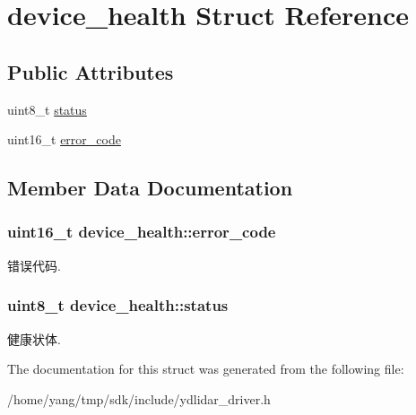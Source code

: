 \hypertarget{structdevice__health}{}\section{device\+\_\+health Struct Reference}
\label{structdevice__health}
\subsection*{Public Attributes}
\begin{DoxyCompactItemize}
\item 
uint8\+\_\+t \hyperlink{structdevice__health_ac3425f5555ecbb5a0da03b4cabe2777c}{status}
\item 
uint16\+\_\+t \hyperlink{structdevice__health_a8815828d6de33cb43e8b72da48f51f23}{error\+\_\+code}
\end{DoxyCompactItemize}


\subsection{Member Data Documentation}
\subsubsection[{\texorpdfstring{error\+\_\+code}{error_code}}]{\setlength{\rightskip}{0pt plus 5cm}uint16\+\_\+t device\+\_\+health\+::error\+\_\+code}\hypertarget{structdevice__health_a8815828d6de33cb43e8b72da48f51f23}{}\label{structdevice__health_a8815828d6de33cb43e8b72da48f51f23}
错误代码. 
\subsubsection[{\texorpdfstring{status}{status}}]{\setlength{\rightskip}{0pt plus 5cm}uint8\+\_\+t device\+\_\+health\+::status}\hypertarget{structdevice__health_ac3425f5555ecbb5a0da03b4cabe2777c}{}\label{structdevice__health_ac3425f5555ecbb5a0da03b4cabe2777c}
健康状体. 

The documentation for this struct was generated from the following file\+:\begin{DoxyCompactItemize}
\item 
/home/yang/tmp/sdk/include/ydlidar\+\_\+driver.\+h\end{DoxyCompactItemize}
